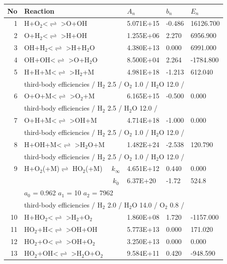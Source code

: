 \documentclass[11pt]{article}
\begin{document}
\begin{table}[hbt]
\begin{tabular}{|r l c l l l|} \hline 
No& Reaction &   & $A_n$& $b_n$ & $E_n$\\ \hline 
1 &	H+O$_{2}$<$\rightleftharpoons$ >O+OH&	&	5.071E+15&	-0.486&	16126.700\\ 
2 &	O+H$_{2}$<$\rightleftharpoons$ >H+OH&	&	1.255E+06&	2.270&	6956.900\\ 
3 &	OH+H$_{2}$<$\rightleftharpoons$ >H+H$_{2}$O&	&	4.380E+13&	0.000&	6991.000\\ 
4 &	OH+OH<$\rightleftharpoons$ >O+H$_{2}$O&	&	8.500E+04&	2.264&	-1784.800\\ 
5 &	H+H+M<$\rightleftharpoons$ >H$_{2}$+M&	&	4.981E+18&	-1.213&	612.040\\ 
	&\multicolumn{5}{l|}{third-body efficiencies  / H$_{2}$ 2.5 / O$_{2}$ 1.0 / H$_{2}$O 12.0 /}\\ 
6 &	O+O+M<$\rightleftharpoons$ >O$_{2}$+M&	&	6.165E+15&	-0.500&	0.000\\ 
	&\multicolumn{5}{l|}{third-body efficiencies  / H$_{2}$ 2.5 / H$_{2}$O 12.0 /}\\ 
7 &	O+H+M<$\rightleftharpoons$ >OH+M&	&	4.714E+18&	-1.000&	0.000\\ 
	&\multicolumn{5}{l|}{third-body efficiencies  / H$_{2}$ 2.5 / O$_{2}$ 1.0 / H$_{2}$O 12.0 /}\\ 
8 &	H+OH+M<$\rightleftharpoons$ >H$_{2}$O+M&	&	1.482E+24&	-2.538&	120.790\\ 
	&\multicolumn{5}{l|}{third-body efficiencies  / H$_{2}$ 2.5 / O$_{2}$ 1.0 / H$_{2}$O 12.0 /}\\ 
9 &	H+O$_{2}$(+M)$\rightleftharpoons$ HO$_{2}$(+M)&	$k_{\infty}$&	4.651E+12&	0.440&	0.000\\ 
	&	&	$k_0$&	6.37E+20&-1.72&	  524.8\\ 
	&\multicolumn{5}{l|}{	$a_0$ = 0.962	$a_1$ = 10	$a_2$ = 7962}\\ 
	&\multicolumn{5}{l|}{third-body efficiencies  / H$_{2}$ 2.0 / H$_{2}$O 14.0 / O$_{2}$ 0.8 /}\\ 
10 &	H+HO$_{2}$<$\rightleftharpoons$ >H$_{2}$+O$_{2}$&	&	1.860E+08&	1.720&	-1157.000\\ 
11 &	HO$_{2}$+H<$\rightleftharpoons$ >OH+OH&	&	5.773E+13&	0.000&	171.020\\ 
12 &	HO$_{2}$+O<$\rightleftharpoons$ >OH+O$_{2}$&	&	3.250E+13&	0.000&	0.000\\ 
13 &	HO$_{2}$+OH<$\rightleftharpoons$ >H$_{2}$O+O$_{2}$&	&	9.584E+11&	0.420&	-948.590\\ 

\end{tabular}
\end{table}
\end{document}
